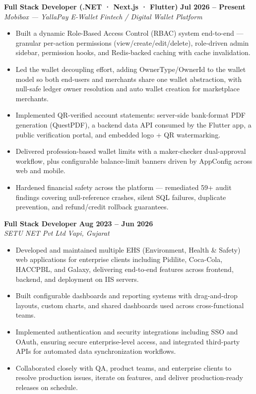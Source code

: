 \documentclass[11pt,letterpaper]{article}
\begin{document}
\textbf{Full Stack Developer (.NET · Next.js · Flutter)} \hfill \textbf{Jul 2026 -- Present} \\
\textit{Mobibox — YallaPay E-Wallet} \hfill \textit{Fintech / Digital Wallet Platform}
\vspace{-6pt}
\begin{itemize}[label=\textbullet, leftmargin=16pt, labelsep=6pt, itemsep=1.5pt]
    \item Built a dynamic Role-Based Access Control (RBAC) system end-to-end — granular per-action permissions (view/create/edit/delete), role-driven admin sidebar, permission hooks, and Redis-backed caching with cache invalidation.
    \item Led the wallet decoupling effort, adding OwnerType/OwnerId to the wallet model so both end-users and merchants share one wallet abstraction, with null-safe ledger owner resolution and auto wallet creation for marketplace merchants.
    \item Implemented QR-verified account statements: server-side bank-format PDF generation (QuestPDF), a backend data API consumed by the Flutter app, a public verification portal, and embedded logo + QR watermarking.
    \item Delivered profession-based wallet limits with a maker-checker dual-approval workflow, plus configurable balance-limit banners driven by AppConfig across web and mobile.
    \item Hardened financial safety across the platform — remediated 59+ audit findings covering null-reference crashes, silent SQL failures, duplicate prevention, and refund/credit rollback guarantees.
\end{itemize}

\vspace{3pt}

\textbf{Full Stack Developer} \hfill \textbf{Aug 2023 -- Jun 2026} \\
\textit{SETU NET Pvt Ltd} \hfill \textit{Vapi, Gujarat}
\vspace{-6pt}
\begin{itemize}[label=\textbullet, leftmargin=16pt, labelsep=6pt, itemsep=1.5pt]
    \item Developed and maintained multiple EHS (Environment, Health \& Safety) web applications for enterprise clients including Pidilite, Coca-Cola, HACCPBL, and Galaxy, delivering end-to-end features across frontend, backend, and deployment on IIS servers.
    \item Built configurable dashboards and reporting systems with drag-and-drop layouts, custom charts, and shared dashboards used across cross-functional teams.
    \item Implemented authentication and security integrations including SSO and OAuth, ensuring secure enterprise-level access, and integrated third-party APIs for automated data synchronization workflows.
    \item Collaborated closely with QA, product teams, and enterprise clients to resolve production issues, iterate on features, and deliver production-ready releases on schedule.
\end{itemize}
\end{document}
